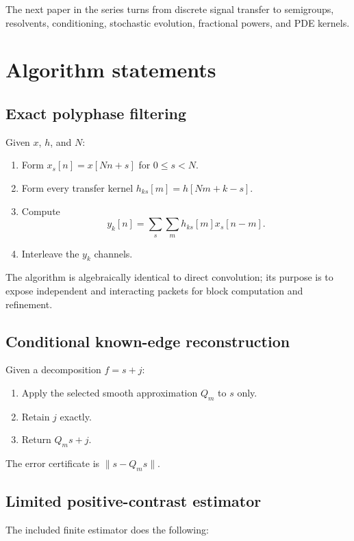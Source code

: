 \documentclass[11pt]{article}
\theoremstyle{definition}
\theoremstyle{remark}
\begin{document}
The next paper in the series turns from discrete signal transfer to semigroups, resolvents, conditioning, stochastic evolution, fractional powers, and PDE kernels.

\appendix
\section{Algorithm statements}

\subsection{Exact polyphase filtering}

Given $x$, $h$, and $N$:

\begin{enumerate}
\item Form $x_s[n]=x[Nn+s]$ for $0\le s<N$.
\item Form every transfer kernel $h_{ks}[m]=h[Nm+k-s]$.
\item Compute
\[
y_k[n]=\sum_s\sum_mh_{ks}[m]x_s[n-m].
\]
\item Interleave the $y_k$ channels.
\end{enumerate}

The algorithm is algebraically identical to direct convolution; its purpose is to expose independent and interacting packets for block computation and refinement.

\subsection{Conditional known-edge reconstruction}

Given a decomposition $f=s+j$:

\begin{enumerate}
\item Apply the selected smooth approximation $Q_m$ to $s$ only.
\item Retain $j$ exactly.
\item Return $Q_ms+j$.
\end{enumerate}

The error certificate is $\|s-Q_ms\|$.

\subsection{Limited positive-contrast estimator}

The included finite estimator does the following:
\end{document}
